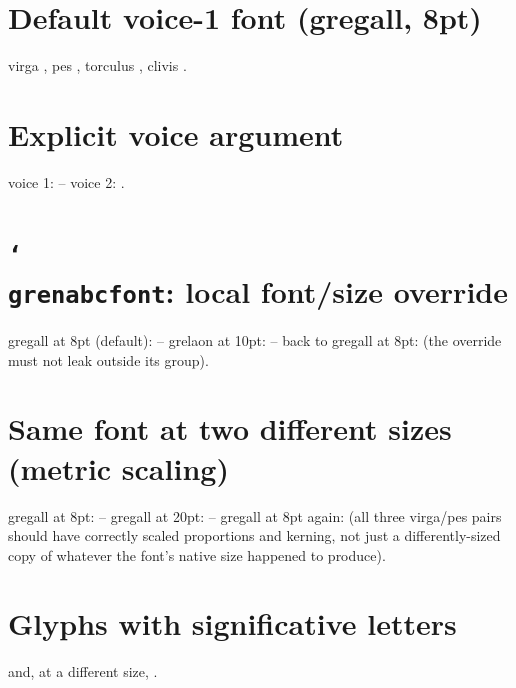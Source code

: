 \documentclass[11pt]{article}
\begin{document}
\section*{Default voice-1 font (gregall, 8pt)}
\noindent virga , pes , torculus
, clivis .

\bigskip
\section*{Explicit voice argument}
\noindent voice 1:  -- voice 2: .

\bigskip
\section*{\texttt{\char`\\grenabcfont}: local font/size override}
\noindent gregall at 8pt (default):  
 --
grelaon at 10pt: {%
  } --
back to gregall at 8pt:   
(the override must not leak outside its group).

\bigskip
\section*{Same font at two different sizes (metric scaling)}
\noindent gregall at 8pt:   --
gregall at 20pt: {%
 } --
gregall at 8pt again:  
(all three virga/pes pairs should have correctly scaled proportions and
kerning, not just a differently-sized copy of whatever the font's native
size happened to produce).

\bigskip
\section*{Glyphs with significative letters}
\noindent {} and, at a different size,
{}.
\end{document}

